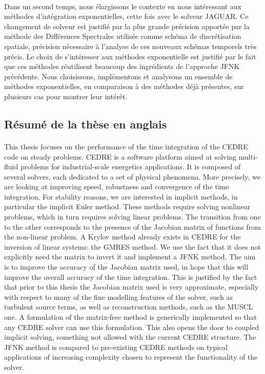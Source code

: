     \paragraph{}
    Dans un second temps, nous élargissons le contexte en nous intéressant aux méthodes d'intégration exponentielles, cette fois avec le solveur JAGUAR.
    Ce changement de solveur est justifié par la plus grande précision apportée par la méthode des Différences Spectrales utilisée comme schéma de discrétisation spatiale, précision nécessaire à l'analyse de ces nouveaux schémas temporels très précis.
    Le choix de s'intéresser aux méthodes exponentielle est justifié par le fait que ces méthodes réutilisent beaucoup des ingrédients de l'approche JFNK précédente.
    Nous choisissons, implémentons et analysons un ensemble de méthodes exponentielles, en comparaison à des méthodes déjà présentes, sur plusieurs cas pour montrer leur intérêt.


  \subsection*{Résumé de la thèse en anglais}


    \paragraph{}
    This thesis focuses on the performance of the time integration of the CEDRE code on steady problems.
    CEDRE is a software platform aimed at solving multi-fluid problems for industrial-scale energetics applications.
    It is composed of several solvers, each dedicated to a set of physical phenomena.
    More precisely, we are looking at improving speed, robustness and convergence of the time integration.
    For stability reasons, we are interested in implicit methods, in particular the implicit Euler method.
    These methods require solving nonlinear problems, which in turn requires solving linear problems.
    The transition from one to the other corresponds to the presence of the Jacobian matrix of functions from the non-linear problem.
    A Krylov method already exists in CEDRE for the inversion of linear systems: the GMRES method.
    We use the fact that it does not explicitly need the matrix to invert it and implement a JFNK method.
    The aim is to improve the accuracy of the Jacobian matrix used, in hope that this will improve the overall accuracy of the time integration.
    This is justified by the fact that prior to this thesis the Jacobian matrix used is very approximate, especially with respect to many of the fine modelling features of the solver, such as turbulent source terms, as well as reconstruction methods, such as the MUSCL one.
    A formulation of the matrix-free method is generically implemented so that any CEDRE solver can use this formulation.
    This also opens the door to coupled implicit solving, something not allowed with the current CEDRE structure.
    The JFNK method is compared to pre-existing CEDRE methods on typical applications of increasing complexity chosen to represent the functionality of the solver.

